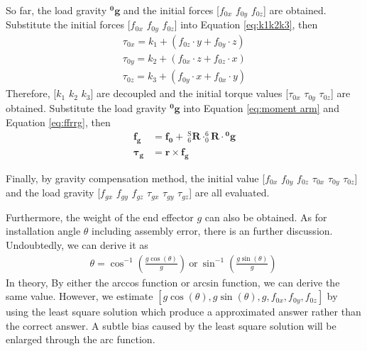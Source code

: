 So far, the load gravity $\boldsymbol{^0\!g}$ and the initial forces [$f_{0x}$ $f_{0y}$ $f_{0z}$] are obtained. Substitute the initial forces [$f_{0x}$ $f_{0y}$ $f_{0z}$] into Equation \ref{eq:k1k2k3}, then
\begin{equation}
\begin{split}
\tau _{0x}	=	k_1	+ \left( f_{0z} \cdot y + f_{0y} \cdot z \right) \\
\tau _{0y} 	=	k_2	+ \left( f_{0x} \cdot z + f_{0z} \cdot x \right) \\
\tau _{0z} 	=	k_3 + \left( f_{0y} \cdot x + f_{0x} \cdot y \right)
\end{split}
\end{equation}
Therefore, [$k_1$ $k_2$ $k_3$] are decoupled and the initial torque values [$\tau_{0x}$ $\tau_{0y}$ $\tau_{0z}$] are obtained. Substitute the load gravity $\boldsymbol{^0\!g}$ into Equation \ref{eq:moment arm} and Equation \ref{eq:ffrrg}, then
\begin{equation}
\begin{split}
\boldsymbol{f_g} &= \boldsymbol{f_0} +\ ^\mathrm{S}_6\mathbf{R} \cdot ^6_0\!\mathbf{R} \cdot \boldsymbol{^0\!g}	\\
\boldsymbol{\tau_g}	&= \boldsymbol{r} \times \boldsymbol{f_g} 
\end{split}
\end{equation}  
\par
Finally, by gravity compensation method, the initial value [$f_{0x}$ $f_{0y}$ $f_{0z}$ $\tau_{0x}$ $\tau_{0y}$ $\tau_{0z}$] and the load gravity [$f_{gx}$ $f_{gy}$ $f_{gz}$ $\tau_{gx}$ $\tau_{gy}$ $\tau_{gz}$] are all evaluated.
\par
Furthermore, the weight of the end effector $g$ can also be obtained. As for installation angle $\theta$ including assembly error, there is an further discussion. Undoubtedly, we can derive it as
\begin{equation}
\begin{split}
\theta = \cos^{-1}\left(\frac{g\cos(\theta)}{g}\right)\ \text{or} \ \sin^{-1}\left(\frac{g\sin(\theta)}{g}\right)\
\end{split}
\end{equation}
In theory, By either the arccos function or arcsin function, we can derive the same value. However, we estimate $[g\cos(\theta),g\sin(\theta),g,f_{0x},f_{0y},f_{0z}]$ by using the least square solution which produce a approximated answer rather than the correct answer. A subtle bias caused by the least square solution will be enlarged through the arc function. 
